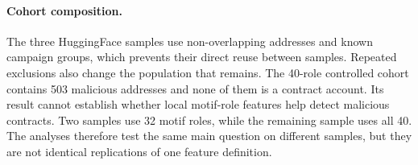 \paragraph{Cohort composition.}
The three HuggingFace samples use non-overlapping addresses and known campaign
groups, which prevents their direct reuse between samples. Repeated exclusions
also change the population that remains. The 40-role controlled cohort
contains 503 malicious addresses and none of them is a contract account. Its
result cannot establish whether local motif-role features help detect malicious contracts.
Two samples use 32 motif roles, while the remaining sample uses all 40. The
analyses therefore test the same main question on different samples, but
they are not identical replications of one feature definition.

